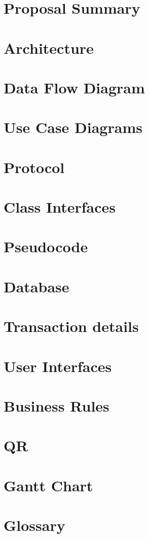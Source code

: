 \chapter{Proposal Summary}


\chapter{Architecture}


\chapter{Data Flow Diagram}


\chapter{Use Case Diagrams}


\chapter{Protocol}


\chapter{Class Interfaces}


\chapter{Pseudocode}


\chapter{Database}


\chapter{Transaction details}


\chapter{User Interfaces}


\chapter{Business Rules}


\chapter{QR}


\chapter{Gantt Chart}


\chapter{Glossary}

